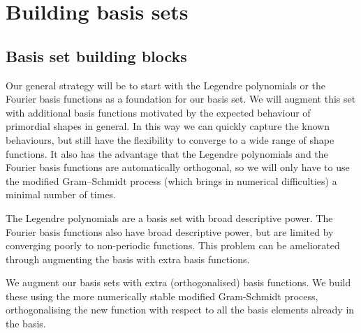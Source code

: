 \section{Building basis sets}
    \subsection{Basis set building blocks}
    Our general strategy will be to start with the Legendre polynomials
    or the Fourier basis functions as a foundation for our basis set.
    We will augment this set with additional basis functions motivated by the
    expected behaviour of primordial shapes in general.
    In this way we can quickly capture the known behaviours,
    but still have the flexibility to converge to a wide range
    of shape functions. It also has the advantage that the Legendre polynomials
    and the Fourier basis functions are automatically orthogonal,
    so we will only have to use the modified Gram–Schmidt process
    (which brings in numerical difficulties)
    a minimal number of times.


    The Legendre polynomials are a basis set with broad descriptive power.
    The Fourier basis functions also have broad descriptive power,
    but are limited by converging poorly to non-periodic functions.
    This problem can be ameliorated through augmenting the basis
    with extra basis functions.


    We augment our basis sets with extra (orthogonalised) basis functions.
    We build these using the more numerically stable modified Gram-Schmidt process,
    orthogonalising the new function with respect to all the basis elements already in
    the basis.


